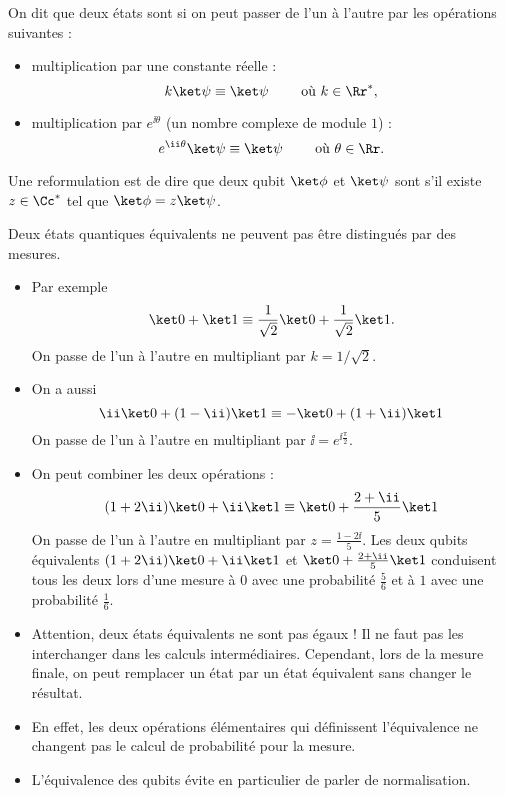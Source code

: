 \documentclass[11pt,class=report,crop=false]{standalone}
\begin{document}
On dit que deux états sont  si on peut passer de l'un à l'autre par les opérations suivantes :
\begin{itemize}
  \item multiplication par une constante réelle :
$$k \ket\psi \equiv \ket \psi \qquad \text{ où } k \in \Rr^*,$$
  \item multiplication par $e^{\ii\theta}$ (un nombre complexe de module $1$) :
$$e^{\ii \theta} \ket\psi \equiv \ket \psi \qquad \text{ où } \theta \in \Rr.$$
\end{itemize}

Une reformulation est de dire que deux qubit $\ket\phi$ et $\ket\psi$ sont  s'il existe $z\in\Cc^*$ tel que $\ket\phi = z \ket\psi$.

Deux états quantiques équivalents ne peuvent pas être distingués par des mesures.

\begin{exemple}
\sauteligne
\begin{itemize}
  \item Par exemple 
$$\ket0 + \ket1 \equiv \frac{1}{\sqrt2}\ket0+\frac{1}{\sqrt2}\ket1.$$
On passe de l'un à l'autre en multipliant par $k=1/\sqrt2$.

  \item On a aussi
$$\ii\ket0 + (1-\ii) \ket1 \equiv -\ket 0 + (1+\ii)\ket1$$
On passe de l'un à l'autre en multipliant par $\ii = e^{\ii \frac\pi2}$.
 
  \item On peut combiner les deux opérations :
$$(1+2\ii)\ket0 + \ii \ket1 \equiv \ket 0 + \frac{2+\ii}{5}\ket1$$
On passe de l'un à l'autre en multipliant par $z=\frac{1-2\ii}{5}$.
Les deux qubits équivalents $(1+2\ii)\ket0 + \ii \ket1$ et $\ket 0 + \frac{2+\ii}{5}\ket1$ conduisent tous les deux lors d'une mesure à $0$ avec une probabilité $\frac{5}{6}$ et à $1$ avec une probabilité $\frac{1}{6}$.
\end{itemize}
\end{exemple}


\begin{remarque*}
\sauteligne
\begin{itemize}
  \item Attention, deux états équivalents ne sont pas égaux ! Il ne faut pas les interchanger dans les calculs intermédiaires. Cependant, lors de la mesure finale, on peut remplacer un état par un état équivalent sans changer le résultat. 
  \item En effet, les deux opérations élémentaires qui définissent l'équivalence ne changent pas le calcul de probabilité pour la mesure.
  \item L'équivalence des qubits évite en particulier de parler de normalisation.
\end{itemize}
\end{remarque*}
\end{document}
